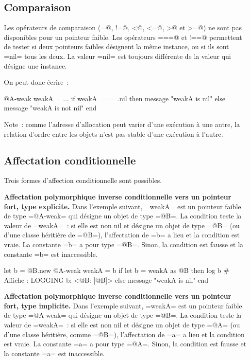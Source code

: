 \subsection{Comparaison}

Les opérateurs de comparaison (\ggst@=@, \ggst@!=@, \ggst@<@, \ggst@<=@, \ggst@>@ et \ggst@>=@) ne sont pas disponibles pour un pointeur faible. Les opérateurs \ggst@===@ et \ggst@!==@ permettent de tester si deux pointeurs faibles désignent la même instance, ou si ils sont \ggst=nil= tous les deux. La valeur \ggst=nil= est toujours différente de la valeur qui désigne une instance.


On peut donc écrire~:
\begin{galgas3}
  @A-weak weakA = ...
  if weakA === .nil then
    message "weakA is nil\n"
  else
    message "weakA is not nil\n"
  end
\end{galgas3}


Note~: comme l'adresse d'allocation peut varier d'une exécution à une autre, la relation d'ordre entre les objets n'est pas stable d'une exécution à l'autre.




\subsection{Affectation conditionnelle}

Trois formes d'affection conditionnelle sont possibles.

{\bf Affectation polymorphique inverse conditionnelle vers un pointeur fort, type explicite.}  Dans l'exemple suivant, \ggst=weakA= est un pointeur faible de type \ggst=@A-weak= qui désigne un objet de type \ggst=@B=. La condition teste la valeur de \ggst=weakA=~: si elle est non nil et désigne un objet de type \ggst=@B= (ou d'une classe héritière de \ggst=@B=), l'affectation de \ggst=b= a lieu et la condition est vraie. La constante \ggst=b= a pour type \ggst=@B=. Sinon, la condition est fausse et la constante \ggst=b= est inaccessible.

\begin{galgas3}
  let b = @B.new
  @A-weak weakA = b
  if let b = weakA as @B then
    log b # Affiche : LOGGING b: <@B: [@B]>
  else
    message "weakA is nil\n"
  end
\end{galgas3}


{\bf Affectation polymorphique inverse conditionnelle vers un pointeur fort, type implicite.}  Dans l'exemple suivant, \ggst=weakA= est un pointeur faible de type \ggst=@A-weak= qui désigne un objet de type \ggst=@B=. La condition teste la valeur de \ggst=weakA=~: si elle est non nil et désigne un objet de type \ggst=@A= (ou d'une classe héritière, comme \ggst=@B=), l'affectation de \ggst=a= a lieu et la condition est vraie. La constante \ggst=a= a pour type \ggst=@A=. Sinon, la condition est fausse et la constante \ggst=a= est inaccessible.

